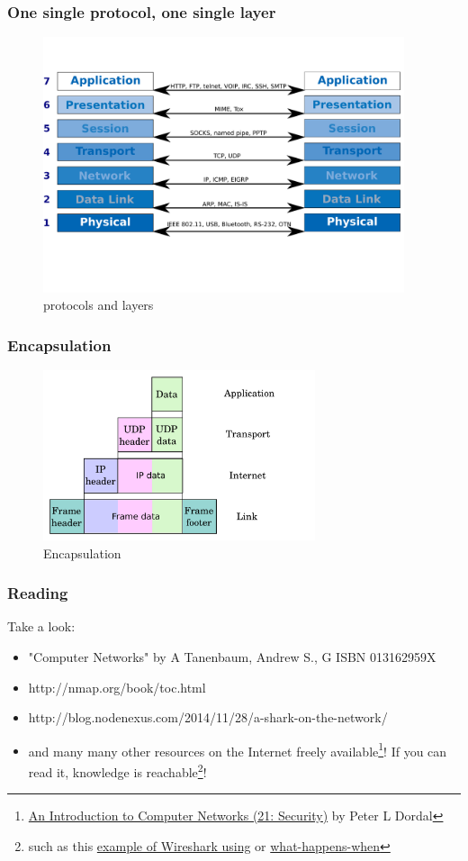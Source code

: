   \begin{frame}
    \frametitle{One single protocol, one single layer}
    \begin{figure}[t]
      \centering
      \includegraphics[height=7.5cm]{./imgs/layer2protocol.pdf}
      \caption{protocols and layers}
      \label{fig:layers2proto}
    \end{figure}
  \end{frame}
  \begin{frame}
    \frametitle{Encapsulation}
    \begin{figure}[t]
      \centering
      \includegraphics[height=5cm]{./imgs/encapsulation.pdf}
      \caption{Encapsulation}
      \label{fig:encapsulation}
    \end{figure}
  \end{frame}

  \begin{frame}
    \frametitle{Reading}
    \begin{block}{Take a look:}
      \begin{itemize}
        \item "Computer Networks" by A Tanenbaum, Andrew S., G ISBN 013162959X
        \item http://nmap.org/book/toc.html
        \item http://blog.nodenexus.com/2014/11/28/a-shark-on-the-network/
        \item and many many other resources on the Internet freely available\footnote{{\color{blue}\href{http://intronetworks.cs.luc.edu/current/ComputerNetworks.pdf}{An Introduction to Computer Networks (21: Security)}} by Peter L Dordal}! If you can read it, knowledge is reachable\footnote{such as this {\color{blue}\href{https://silverskylabs.github.io/yakhak/}{example of Wireshark using}} or {\color{blue}\href{https://github.com/alex/what-happens-when}{what-happens-when}}}!
      \end{itemize}
    \end{block}
  \end{frame}
